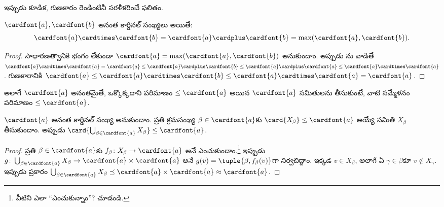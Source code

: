\documentclass[../../../include/open-logic-section]{subfiles}
\begin{document}
ఇప్పుడు కూడిక, గుణకారం రెండింటినీ సరళీకరించే ఫలితం.

\begin{thm}
$\cardfont{a}, \cardfont{b}$ అనంత కార్డినల్ సంఖ్యలు అయితే:
\[
	\cardfont{a}
\cardtimes \cardfont{b} = \cardfont{a} \cardplus \cardfont{b} =
\text{max}(\cardfont{a}, \cardfont{b}).
\]
\end{thm}

\begin{proof}
సాధారణత్వానికి భంగం లేకుండా $\cardfont{a} = \max(\cardfont{a},
\cardfont{b})$ అనుకుందాం. అప్పుడు ను వాడితే $\cardfont{a}\cardtimes\cardfont{a} = \cardfont{a} \leq \cardfont{a}
\cardplus \cardfont{b} \leq \cardfont{a} \cardplus \cardfont{a} \leq
\cardfont{a} \cardtimes \cardfont{a}$. గుణకారానికి $\cardfont{a} \leq \cardfont{a} \cardtimes \cardfont{b} \leq \cardfont{a} \cardtimes \cardfont{a} = \cardfont{a}$. \end{proof}\noindent అలాగే $\cardfont{a}$ అనంతమైతే, ఒక్కొక్కదాని పరిమాణం $\leq\cardfont{a}$ అయిన $\cardfont{a}$ సమితులను తీసుకుంటే, వాటి సమ్మేళనం పరిమాణం $\leq\cardfont{a}$.

\begin{prop}
$\cardfont{a}$ అనంత కార్డినల్ సంఖ్య అనుకుందాం. ప్రతి క్రమసంఖ్య $\beta
\in \cardfont{a}$కు $\card{X_\beta} \leq \cardfont{a}$ అయ్యే సమితి $X_\beta$ తీసుకుందాం. అప్పుడు $\card{\bigcup_{\beta \in \cardfont{a}} X_\beta}
\leq \cardfont{a}$.
\end{prop}

\begin{proof}
ప్రతి $\beta \in \cardfont{a}$కు $f_\beta \colon
X_\beta \to \cardfont{a}$ అనే  ఎంచుకుందాం.\footnote{వీటిని ఎలా ``ఎంచుకున్నాం''?  చూడండి.} ఇప్పుడు $g \colon
\bigcup_{\beta \in \cardfont{a}} X_\beta \to \cardfont{a} \times
\cardfont{a}$ అనే  $g(v) = \tuple{\beta, f_\beta(v)}$గా నిర్వచిద్దాం. ఇక్కడ $v \in
X_\beta$, అలాగే ఏ $\gamma \in \beta$కూ $v \notin X_\gamma$. ఇప్పుడు  ప్రకారం $\bigcup_{\beta \in \cardfont{a}} X_\beta \preceq \cardfont{a} \times
\cardfont{a} \approx \cardfont{a}$.
\end{proof}
\end{document}
